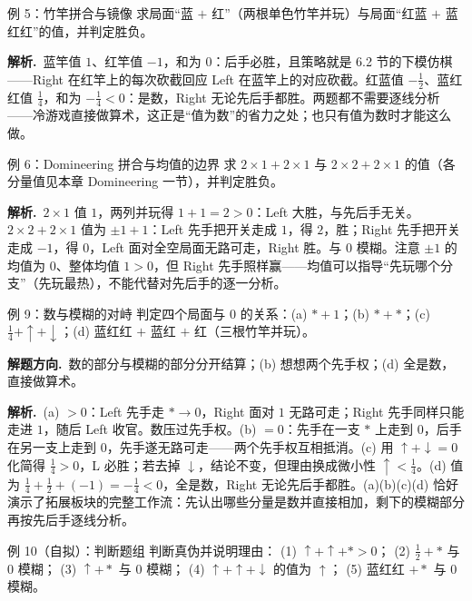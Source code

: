 \documentclass[UTF8,a4paper,11pt,oneside,openany,fontset=fandol]{ctexbook}
\theoremstyle{definition}
\newcommand{\sol}{\par\noindent\textbf{解析.}\ }
\newcommand{\hint}{\par\noindent\textbf{解题方向.}\ }
\begin{document}
\begin{problem}{例 5：竹竿拼合与镜像}
求局面“蓝 $+$ 红”（两根单色竹竿并玩）与局面“红蓝 $+$ 蓝红红”的值，并判定胜负。
\end{problem}

\sol 蓝竿值 $1$、红竿值 $-1$，和为 $0$：后手必胜，且策略就是 6.2 节的下模仿棋——Right 在红竿上的每次砍截回应 Left 在蓝竿上的对应砍截。红蓝值 $-\tfrac12$、蓝红红值 $\tfrac14$，和为 $-\tfrac14<0$：是数，Right 无论先后手都胜。两题都不需要逐线分析——冷游戏直接做算术，这正是“值为数”的省力之处；也只有值为数时才能这么做。

\begin{problem}{例 6：Domineering 拼合与均值的边界}
求 $2\times1+2\times1$ 与 $2\times2+2\times1$ 的值（各分量值见本章 Domineering 一节），并判定胜负。
\end{problem}

\sol $2\times1$ 值 $1$，两列并玩得 $1+1=2>0$：Left 大胜，与先后手无关。$2\times2+2\times1$ 值为 $\pm1+1$：Left 先手把开关走成 $1$，得 $2$，胜；Right 先手把开关走成 $-1$，得 $0$，Left 面对全空局面无路可走，Right 胜。与 $0$ 模糊。注意 $\pm1$ 的均值为 $0$、整体均值 $1>0$，但 Right 先手照样赢——均值可以指导“先玩哪个分支”（先玩最热），不能代替对先后手的逐一分析。

\begin{problem}{例 9：数与模糊的对峙}
判定四个局面与 $0$ 的关系：(a) $\ast+1$；(b) $\ast+\ast$；(c) $\tfrac14+\uparrow+\downarrow$；(d) 蓝红红 $+$ 蓝红 $+$ 红（三根竹竿并玩）。
\end{problem}

\hint 数的部分与模糊的部分分开结算；(b) 想想两个先手权；(d) 全是数，直接做算术。

\sol (a) $>0$：Left 先手走 $\ast\to0$，Right 面对 $1$ 无路可走；Right 先手同样只能走进 $1$，随后 Left 收官。数压过先手权。(b) $=0$：先手在一支 $\ast$ 上走到 $0$，后手在另一支上走到 $0$，先手遂无路可走——两个先手权互相抵消。(c) 用 $\uparrow+\downarrow=0$ 化简得 $\tfrac14>0$，L 必胜；若去掉 $\downarrow$，结论不变，但理由换成微小性 $\uparrow<\tfrac14$。(d) 值为 $\tfrac14+\tfrac12+(-1)=-\tfrac14<0$，全是数，Right 无论先后手都胜。(a)(b)(c)(d) 恰好演示了拓展板块的完整工作流：先认出哪些分量是数并直接相加，剩下的模糊部分再按先后手逐线分析。

\begin{problem}{例 10（自拟）：判断题组}
判断真伪并说明理由：
(1) $\uparrow+\uparrow+\ast>0$；
(2) $\tfrac12+\ast$ 与 $0$ 模糊；
(3) $\uparrow+\ast$ 与 $0$ 模糊；
(4) $\uparrow+\uparrow+\downarrow$ 的值为 $\uparrow$；
(5) 蓝红红 $+\ast$ 与 $0$ 模糊。
\end{problem}
\end{document}
